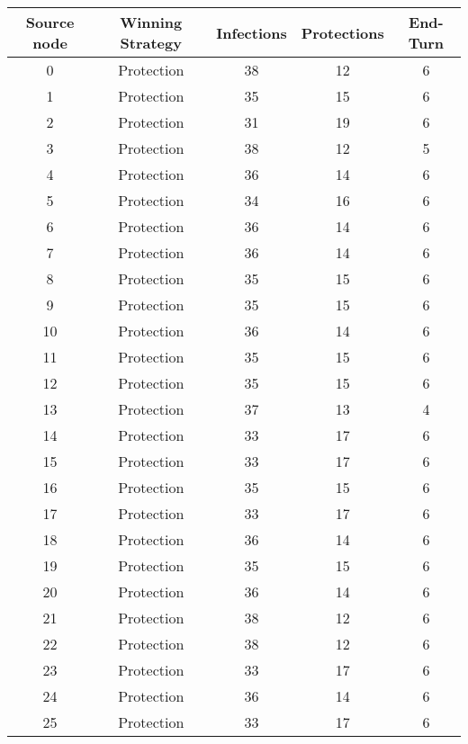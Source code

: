 \documentclass[results.tex]{subfiles}
\begin{document}
\begin{center}
  \begin{tabular}{| c || c | c | c | c |}
    \hline
    {\bfseries Source node} & {\bfseries Winning Strategy} & {\bfseries Infections} & {\bfseries Protections} & {\bfseries End-Turn} \\  %
    \hline\hline
    0 & Protection & 38 & 12 & 6 \\ 
    \hline
    1 & Protection & 35 & 15 & 6 \\ 
    \hline
    2 & Protection & 31 & 19 & 6 \\ 
    \hline
    3 & Protection & 38 & 12 & 5 \\ 
    \hline
    4 & Protection & 36 & 14 & 6 \\ 
    \hline
    5 & Protection & 34 & 16 & 6 \\ 
    \hline
    6 & Protection & 36 & 14 & 6 \\ 
    \hline
    7 & Protection & 36 & 14 & 6 \\ 
    \hline
    8 & Protection & 35 & 15 & 6 \\ 
    \hline
    9 & Protection & 35 & 15 & 6 \\ 
    \hline
    10 & Protection & 36 & 14 & 6 \\ 
    \hline
    11 & Protection & 35 & 15 & 6 \\ 
    \hline
    12 & Protection & 35 & 15 & 6 \\ 
    \hline
    13 & Protection & 37 & 13 & 4 \\ 
    \hline
    14 & Protection & 33 & 17 & 6 \\ 
    \hline
    15 & Protection & 33 & 17 & 6 \\ 
    \hline
    16 & Protection & 35 & 15 & 6 \\ 
    \hline
    17 & Protection & 33 & 17 & 6 \\ 
    \hline
    18 & Protection & 36 & 14 & 6 \\ 
    \hline
    19 & Protection & 35 & 15 & 6 \\ 
    \hline
    20 & Protection & 36 & 14 & 6 \\ 
    \hline
    21 & Protection & 38 & 12 & 6 \\ 
    \hline
    22 & Protection & 38 & 12 & 6 \\ 
    \hline
    23 & Protection & 33 & 17 & 6 \\ 
    \hline
    24 & Protection & 36 & 14 & 6 \\ 
    \hline
    25 & Protection & 33 & 17 & 6 \\ 

\end{tabular}
\end{center}
\end{document}
